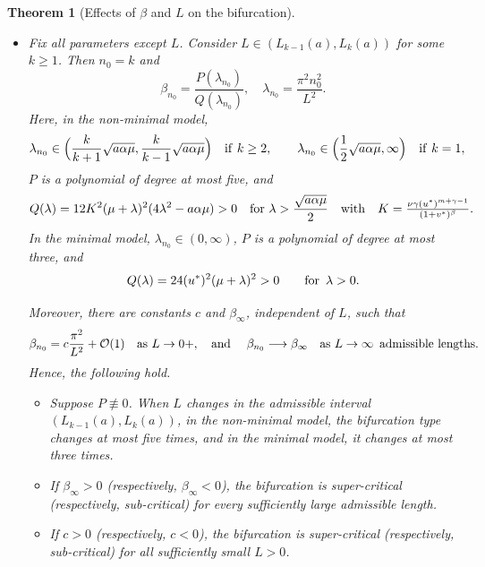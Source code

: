 \documentclass[11pt]{article} %
\newtheorem{theorem}{Theorem}[section] %
\theoremstyle{remark}
\theoremstyle{remark}
\numberwithin{equation}{section}
\numberwithin{figure}{section}
\numberwithin{table}{section}
\begin{document}
\begin{theorem}[Effects of $\beta$ and $L$ on the bifurcation]
\begin{itemize}
    \item[(2)] Fix all parameters except $L$. Consider $L \in (L_{k-1}(a),
      L_k(a))$ for some $k \ge 1$. Then $n_0 = k$ and
      \begin{equation}\label{E:beta-n0-eq1}
        \beta_{n_0}
        =\frac{P(\lambda_{n_0})}{Q(\lambda_{n_0})},\quad
        \lambda_{n_0}=\frac{\pi^2 n_0^2}{L^2}.
      \end{equation}
      Here, in the non-minimal model,
      \[
        \lambda_{n_0}\in    \Big(
        \frac{k}{k+1}\sqrt{a\alpha\mu},
        \frac{k}{k-1}\sqrt{a\alpha\mu}
        \Big)
        \quad {\rm if}\,\, k\ge2,
        \qquad
        \lambda_{n_0}\in \Big(\frac12\sqrt{a\alpha\mu},\infty\Big)\quad {\rm
        if}\,\,
        k=1,
      \]
      $P$ is a polynomial of degree at most five, and
      \[
        Q(\lambda)
        =12K^2(\mu+\lambda)^2(4\lambda^2-a\alpha\mu)> 0\quad{\rm for}\,\,
        \lambda >\frac{\sqrt{a\alpha\mu}}{2}\quad {\rm with}\quad
        K=\tfrac{\nu\gamma(u^*)^{m+\gamma-1}}
        {(1+v^*)^\beta}.
      \]
      In the minimal model, $\lambda_{n_0} \in (0, \infty)$, $P$ is a polynomial
      of degree at most three, and
      \[
        Q(\lambda)=24(u^*)^2(\mu+\lambda)^2>0
        \qquad{\rm for}\,\,\, \lambda>0.
      \]

      Moreover, there are constants $c$ and $\beta_\infty$, independent of $L$,
      such that
      \[
        \beta_{n_0}
        =c\frac{\pi^2}{L^2}+\mathcal{O}(1)
        \quad{\rm as}\,\, L\to0+,\quad {\rm and}\,\,
        \quad
        \beta_{n_0}\longrightarrow\beta_\infty
        \quad{\rm as}\,\, L\to\infty\,\,\, {\rm admissible\,\, lengths.}
      \]
      Hence, the following hold.
      \begin{itemize}
        \item[(i)] Suppose $P\not \equiv 0$. When $L$ changes in the admissible
          interval $ (L_{k-1}(a),L_k(a))$, in the non-minimal model, the
          bifurcation type changes at most five times, and in the minimal model,
          it changes at most three times.

        \item[(ii)] If $\beta_\infty > 0$ (respectively, $\beta_\infty < 0$),
          the bifurcation is super-critical (respectively, sub-critical) for
          every sufficiently large admissible length.

        \item[(iii)] If $c > 0$ (respectively, $c < 0$), the bifurcation is
          super-critical (respectively, sub-critical) for all sufficiently small
          $L > 0$.
      \end{itemize}
  \end{itemize}
\end{theorem}
\end{document}
